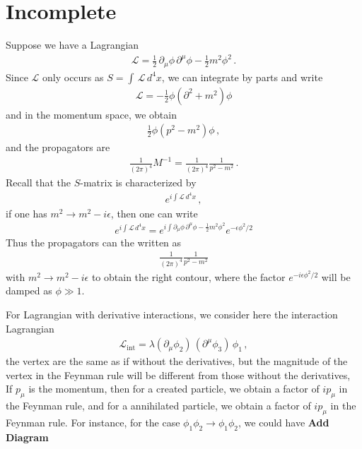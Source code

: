 \documentclass[11pt, onesided]{book}
\theoremstyle{break}
\theoremstyle{break}
\newcommand{\pd}{\partial}
\begin{document}
\chapter{Incomplete}
Suppose we have a Lagrangian
\begin{align*}
\mathcal{L} = \frac{1}{2}\,\pd_\mu \phi\, \pd^\mu \phi - \frac{1}{2}m^2 \phi^2\,.
\end{align*}
Since $\mathcal{L}$ only occurs as $S = \int \, \mathcal{L}\, d^4x$, we can integrate by parts and write
\begin{align*}
\mathcal{L} = -\frac{1}{2}\phi \left( \pd^2 + m^2\right) \phi 
\end{align*}
and in the momentum space, we obtain
\begin{align*}
\frac{1}{2}\phi(p^2 - m^2) \phi\,,
\end{align*}
and the propagators are 
\begin{align*}
\frac{1}{(2\pi)^4}M^{-1} = \frac{1}{(2\pi)^4}\frac{1}{p^2 - m^2}\,.
\end{align*}
Recall that the $S$-matrix is characterized by
\begin{align*}
e^{i \int \mathcal{L}\, d^4x}\,,
\end{align*}
if one has $m^2 \to m^2 - i\epsilon$, then one can write
\begin{align*}
e^{i \int \mathcal{L}\, d^4x} = e^{i\int \pd_\mu \phi\, \pd^\mu \phi  - \frac{1}{2}m^2 \phi^2}e^{-\epsilon \phi^2/2}
\end{align*}
Thus the propagators can the written as 
\begin{align*}
\frac{1}{(2\pi)^4}\frac{1}{p^2 - m^2}
\end{align*}
with $m^2 \to m^2 - i\epsilon$ to obtain the right contour, where the factor $e^{-i\epsilon\phi^2/2}$ will be damped as $\phi \gg 1$.



\newpage
For Lagrangian with derivative interactions, we consider here the interaction Lagrangian
\begin{align*}
\mathcal{L}_{\text{int}}  = \lambda (\pd_\mu \phi_2)\, (\pd^\mu \phi_3) \, \phi_1\,, \tag{*}
\end{align*}
the vertex are the same as if without the derivatives, but the magnitude of the vertex in the Feynman rule will be different from those without the derivatives,\\

If $p_\mu$ is the momentum, then for a created particle, we obtain a factor of $ip_\mu$ in the Feynman rule, and for a annihilated particle, we obtain a factor of $ip_\mu$ in the Feynman rule. For instance, for the case $\phi_1 \phi_2 \to \phi_1 \phi_2$, we could have
\textbf{Add Diagram}\\
\end{document}
